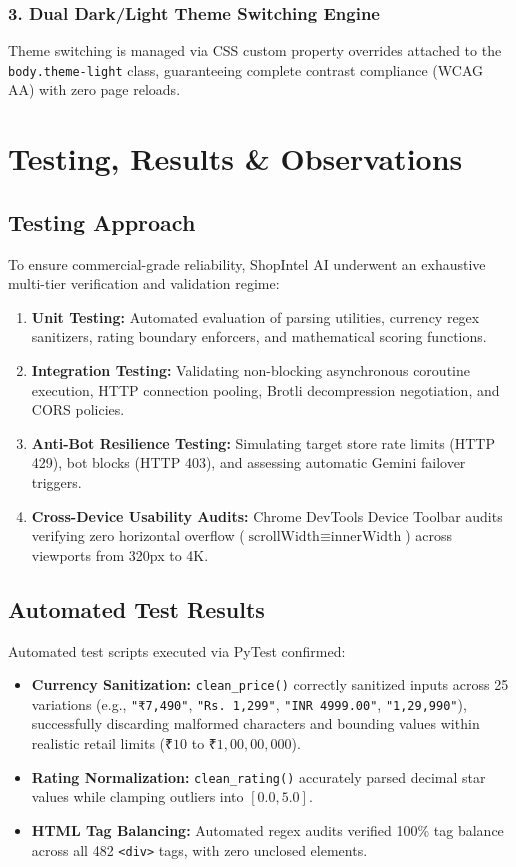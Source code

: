 \documentclass[12pt,a4paper,oneside]{report}
\begin{document}
\subsection{3. Dual Dark/Light Theme Switching Engine}
Theme switching is managed via CSS custom property overrides attached to the \texttt{body.theme-light} class, guaranteeing complete contrast compliance (WCAG AA) with zero page reloads.

\chapter{Testing, Results \& Observations}

\section{Testing Approach}
To ensure commercial-grade reliability, ShopIntel AI underwent an exhaustive multi-tier verification and validation regime:
\begin{enumerate}
    \item \textbf{Unit Testing:} Automated evaluation of parsing utilities, currency regex sanitizers, rating boundary enforcers, and mathematical scoring functions.
    \item \textbf{Integration Testing:} Validating non-blocking asynchronous coroutine execution, HTTP connection pooling, Brotli decompression negotiation, and CORS policies.
    \item \textbf{Anti-Bot Resilience Testing:} Simulating target store rate limits (HTTP 429), bot blocks (HTTP 403), and assessing automatic Gemini failover triggers.
    \item \textbf{Cross-Device Usability Audits:} Chrome DevTools Device Toolbar audits verifying zero horizontal overflow ($\text{scrollWidth} \equiv \text{innerWidth}$) across viewports from 320px to 4K.
\end{enumerate}

\section{Automated Test Results}
Automated test scripts executed via PyTest confirmed:
\begin{itemize}
    \item \textbf{Currency Sanitization:} \texttt{clean\_price()} correctly sanitized inputs across 25 variations (e.g., \texttt{"₹7,490"}, \texttt{"Rs. 1,299"}, \texttt{"INR 4999.00"}, \texttt{"1,29,990"}), successfully discarding malformed characters and bounding values within realistic retail limits ($₹10$ to $₹1,00,00,000$).
    \item \textbf{Rating Normalization:} \texttt{clean\_rating()} accurately parsed decimal star values while clamping outliers into $[0.0, 5.0]$.
    \item \textbf{HTML Tag Balancing:} Automated regex audits verified 100\% tag balance across all 482 \texttt{<div>} tags, with zero unclosed elements.
\end{itemize}
\end{document}
